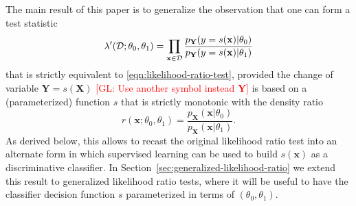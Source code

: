 \documentclass[12pt]{article}
\numberwithin{equation}{section}
\theoremstyle{plain}
\newcommand{\glnote}[1]{\textcolor{red}{[GL: #1]}}
\begin{document}
%

The main result of this paper is to
generalize the observation that one can form a test statistic
\begin{equation}\label{eqn:likelihood-ratio-test-equiv}
\lambda'({\cal D}; \theta_0, \theta_1) = \prod_{\mathbf{x} \in {\cal D}} \frac{ p_\mathbf{Y}(y=s(\mathbf{x}) | \theta_0)}{ p_\mathbf{Y}(y=s(\mathbf{x}) | \theta_1)}
\end{equation}
that is strictly equivalent to \ref{eqn:likelihood-ratio-test}, provided the change
of variable $\mathbf{Y} = s(\mathbf{X})$ \glnote{Use another symbol instead $\mathbf{Y}$} is based
on a (parameterized) function $s$ that is strictly monotonic with the density ratio
\begin{equation}
r(\mathbf{x};\theta_0, \theta_1) = \frac{p_\mathbf{X}(\mathbf{x}|\theta_0)}{p_\mathbf{X}(\mathbf{x}|\theta_1)}.
\end{equation}
As derived below, this allows to recast the original likelihood ratio test into
an alternate form in which supervised learning can be used to build
$s(\mathbf{x})$ as a discriminative classifier.  In
Section~\ref{sec:generalized-likelihood-ratio} we extend this result to
generalized likelihood ratio tests, where it will be useful to have the
classifier decision function $s$ parameterized in terms of $(\theta_0, \theta_1)$.
\end{document}
